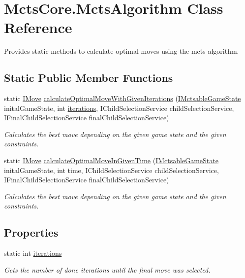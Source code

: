 \hypertarget{class_mcts_core_1_1_mcts_algorithm}{}\section{Mcts\+Core.\+Mcts\+Algorithm Class Reference}
\label{class_mcts_core_1_1_mcts_algorithm}


Provides static methods to calculate optimal moves using the mcts algorithm.  


\subsection*{Static Public Member Functions}
\begin{DoxyCompactItemize}
\item 
static \mbox{\hyperlink{interface_mcts_core_1_1_i_move}{I\+Move}} \mbox{\hyperlink{class_mcts_core_1_1_mcts_algorithm_a9c380699425b42217d10608b797b69f5}{calculate\+Optimal\+Move\+With\+Given\+Iterations}} (\mbox{\hyperlink{interface_mcts_core_1_1_i_mctsable_game_state}{I\+Mctsable\+Game\+State}} inital\+Game\+State, int \mbox{\hyperlink{class_mcts_core_1_1_mcts_algorithm_ae871efb153533b29759ac01fbb2845ab}{iterations}}, I\+Child\+Selection\+Service child\+Selection\+Service, I\+Final\+Child\+Selection\+Service final\+Child\+Selection\+Service)
\begin{DoxyCompactList}\small\item\em Calculates the best move depending on the given game state and the given constraints. \end{DoxyCompactList}\item 
static \mbox{\hyperlink{interface_mcts_core_1_1_i_move}{I\+Move}} \mbox{\hyperlink{class_mcts_core_1_1_mcts_algorithm_a3ba9b28883c962188035e2f16c1c43a0}{calculate\+Optimal\+Move\+In\+Given\+Time}} (\mbox{\hyperlink{interface_mcts_core_1_1_i_mctsable_game_state}{I\+Mctsable\+Game\+State}} inital\+Game\+State, int time, I\+Child\+Selection\+Service child\+Selection\+Service, I\+Final\+Child\+Selection\+Service final\+Child\+Selection\+Service)
\begin{DoxyCompactList}\small\item\em Calculates the best move depending on the given game state and the given constraints. \end{DoxyCompactList}\end{DoxyCompactItemize}
\subsection*{Properties}
\begin{DoxyCompactItemize}
\item 
static int \mbox{\hyperlink{class_mcts_core_1_1_mcts_algorithm_ae871efb153533b29759ac01fbb2845ab}{iterations}}
\begin{DoxyCompactList}\small\item\em Gets the number of done iterations until the final move was selected. \end{DoxyCompactList}\end{DoxyCompactItemize}


